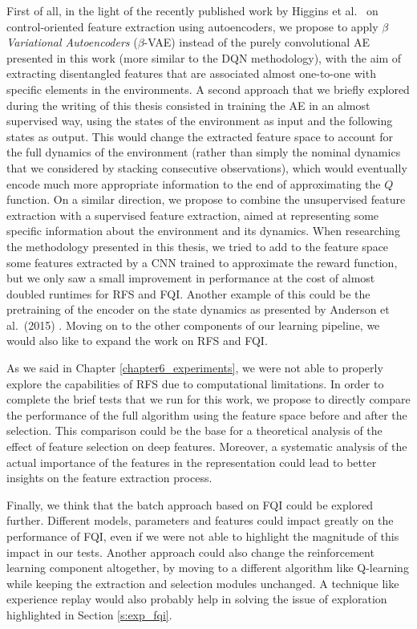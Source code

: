 First of all, in the light of the recently published work by Higgins et al.\ \cite{higgins2017darla}
on control-oriented feature extraction using autoencoders, we propose to apply
\textit{$\beta$ Variational Autoencoders} ($\beta$-VAE) \cite{kingma2014auto, higgins2017beta} 
instead of the purely convolutional AE presented in this work (more similar to 
the DQN methodology), with the aim of extracting disentangled features that
are associated almost one-to-one with specific elements in the environments.
A second approach that we briefly explored during the writing of this thesis 
consisted in training the AE in an almost supervised way, using the states of 
the environment as input and the following states as output. 
This would change the extracted feature space to account for the full dynamics 
of the environment (rather than simply the nominal dynamics that we considered 
by stacking consecutive observations), which would eventually 
encode much more appropriate information to the end of approximating the $Q$ 
function. 
On a similar direction, we propose to combine the unsupervised feature 
extraction with a supervised feature extraction, aimed at representing some 
specific information about the environment and its dynamics. 
When researching the methodology presented in this thesis, we tried to add to the 
feature space some features extracted by a CNN trained to approximate the reward 
function, but we only saw a small improvement in performance at the cost of 
almost doubled runtimes for RFS and FQI. 
Another example of this could be the pretraining of the encoder on the state 
dynamics as presented by Anderson et al.\ (2015) \cite{anderson2015faster}.
Moving on to the other components of our learning pipeline, we would also like 
to expand the work on RFS and FQI. 

As we said in Chapter \ref{chapter6_experiments}, we were not able to properly 
explore the capabilities of RFS due to computational limitations.
In order to complete the brief tests that we run for this work, we propose to
directly compare the performance of the full algorithm using the feature space
before and after the selection. 
This comparison could be the base for a theoretical analysis of the
effect of feature selection on deep features. Moreover, a systematic analysis
of the actual importance of the features in the representation could lead
to better insights on the feature extraction process. 

Finally, we think that the batch approach based on FQI could be explored further. 
Different models, parameters and features could impact greatly 
on the performance of FQI, even if we were not able to highlight the 
magnitude of this impact in our tests. 
Another approach could also change the reinforcement learning component 
altogether, by moving to a different algorithm like Q-learning while keeping
the extraction and selection modules unchanged. A technique like experience 
replay would also probably help in solving the issue of exploration highlighted 
in Section \ref{s:exp_fqi}.

